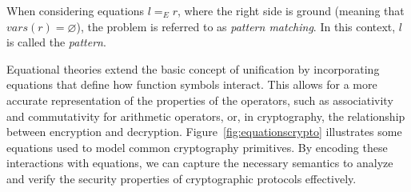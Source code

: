 When considering equations $l =_E r$, where the right side is ground (meaning that $vars(r) = \varnothing$), the problem is referred to as \textit{pattern matching}. In this context, $l$ is called the \textit{pattern}.

Equational theories extend the basic concept of unification by incorporating equations that define how function symbols interact. This allows for a more accurate representation of the properties of the operators, such as associativity and commutativity for arithmetic operators, or, in cryptography, the relationship between encryption and decryption. Figure~\ref{fig:equationscrypto} illustrates some equations used to model common cryptography primitives. By encoding these interactions with equations, we can capture the necessary semantics to analyze and verify the security properties of cryptographic protocols effectively.

